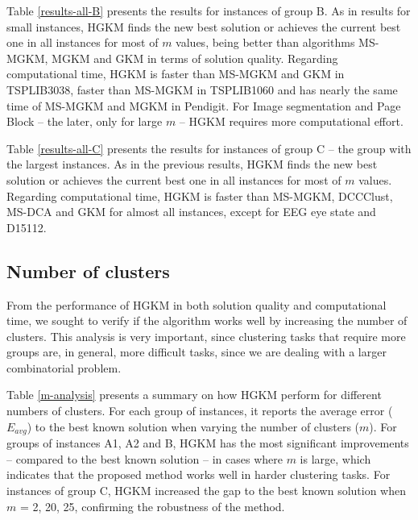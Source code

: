 Table \ref{results-all-B} presents the results for instances of group B. As in results for small instances, HGKM finds the new best solution or achieves the current best one in all instances for most of $m$ values, being better than algorithms MS-MGKM, MGKM and GKM in terms of solution quality. Regarding computational time, HGKM is faster than MS-MGKM and GKM in TSPLIB3038, faster than MS-MGKM in TSPLIB1060 and has nearly the same time of MS-MGKM and MGKM in Pendigit. For Image segmentation and Page Block -- the later, only for large $m$ -- HGKM requires more computational effort.

Table \ref{results-all-C} presents the results for instances of group C -- the group with the largest instances. As in the previous results, HGKM finds the new best solution or achieves the current best one in all instances for most of $m$ values. Regarding computational time, HGKM is faster than MS-MGKM, DCCClust, MS-DCA and GKM for almost all instances, except for EEG eye state and D15112.









\subsection{Number of clusters}
From the performance of HGKM in both solution quality and computational time, we sought to verify if the algorithm works well by increasing the number of clusters. This analysis is very important, since clustering tasks that require more groups are, in general, more difficult tasks, since we are dealing with a larger combinatorial problem.

Table \ref{m-analysis} presents a summary on how HGKM perform for different numbers of clusters.
For each group of instances, it reports the average error ($E_{avg}$) to the best known solution when varying the number of clusters ($m$). For groups of instances A1, A2 and B, HGKM has the most significant improvements -- compared to the best known solution -- in cases where $m$ is large, which indicates that the proposed method works well in harder clustering tasks. For instances of group C, HGKM increased the gap to the best known solution when $m$ = 2, 20, 25, confirming the robustness of the method.



